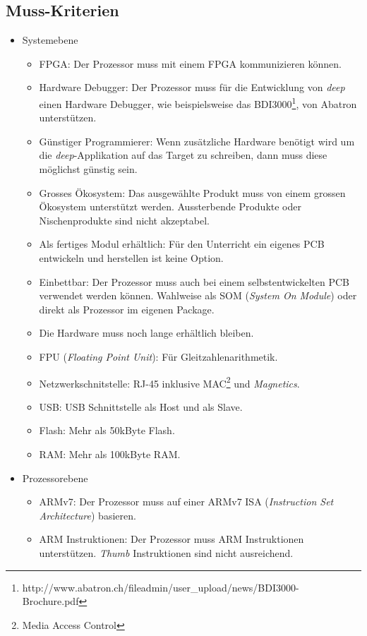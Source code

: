 \subsection{Muss-Kriterien}
\begin{itemize}
\item Systemebene
	\begin{itemize}
	\item FPGA: Der Prozessor muss mit einem FPGA kommunizieren können.
	\item Hardware Debugger: Der Prozessor muss für die Entwicklung von \textit{deep} einen Hardware Debugger, wie beispielsweise das BDI3000\footnote{http://www.abatron.ch/fileadmin/user\_upload/news/BDI3000-Brochure.pdf}, von Abatron unterstützen. 
	\item Günstiger Programmierer: Wenn zusätzliche Hardware benötigt wird um die \textit{deep}-Applikation auf das Target zu schreiben, dann muss diese möglichst günstig sein.
	\item Grosses Ökosystem: Das ausgewählte Produkt muss von einem grossen Ökosystem unterstützt werden. Aussterbende Produkte oder Nischenprodukte sind nicht akzeptabel.
	\item Als fertiges Modul erhältlich: Für den Unterricht ein eigenes PCB entwickeln und herstellen ist keine Option.
	\item Einbettbar: Der Prozessor muss auch bei einem selbstentwickelten PCB verwendet werden können. Wahlweise als SOM (\textit{System On Module}) oder direkt als Prozessor im eigenen Package.
	\item Die Hardware muss noch lange erhältlich bleiben.
	\item FPU (\textit{Floating Point Unit}): Für Gleitzahlenarithmetik.
	\item Netzwerkschnitstelle: RJ-45 inklusive MAC\footnote{Media Access Control} und \textit{Magnetics}.
	\item USB: USB Schnittstelle als Host und als Slave.
	\item Flash: Mehr als 50kByte Flash.
	\item RAM: Mehr als 100kByte RAM.
	\end{itemize}
\item Prozessorebene
	\begin{itemize}
	\item ARMv7: Der Prozessor muss auf einer ARMv7 ISA (\textit{Instruction Set Architecture}) basieren.
	\item ARM Instruktionen: Der Prozessor muss ARM Instruktionen unterstützen. \textit{Thumb} Instruktionen sind nicht ausreichend.
	\end{itemize}
\end{itemize}


